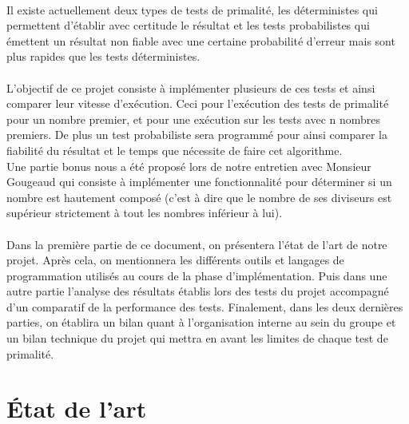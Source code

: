 	\paragraph{}Il existe actuellement deux types de tests de primalité, les déterministes qui permettent d'établir avec certitude le résultat et les tests probabilistes qui émettent un résultat non fiable avec une certaine probabilité d'erreur mais sont plus rapides que les tests déterministes.
	
	\paragraph{}L'objectif de ce projet consiste à implémenter plusieurs de ces tests et ainsi comparer leur vitesse  d'exécution. Ceci pour l'exécution des tests de primalité pour un nombre premier, et pour une exécution sur les tests avec n nombres premiers. De plus un test probabiliste sera programmé pour ainsi comparer la fiabilité du résultat et le temps que nécessite de faire cet algorithme.\\ 
	Une partie bonus nous a été proposé lors de notre entretien avec Monsieur Gougeaud qui consiste à implémenter une fonctionnalité pour déterminer si un nombre est hautement composé (c'est à dire que le nombre de ses diviseurs est supérieur strictement à tout les nombres inférieur à lui). 
	
	\paragraph{}Dans la première partie de ce document, on présentera l'état de l'art de notre projet.
	Après cela, on mentionnera les différents outils et langages de programmation utilisés au cours de la phase d'implémentation. Puis dans une autre partie l'analyse des résultats établis lors des tests du projet accompagné d'un comparatif de la performance des tests.
	Finalement, dans les deux dernières parties, on établira un bilan quant à l'organisation interne au sein du groupe et un bilan technique du projet qui mettra en avant les limites de chaque test de primalité.
	
		
	\section{État de l'art}
